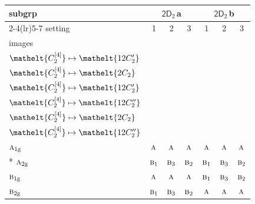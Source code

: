\documentclass[10pt,a4paper]{article}
\numberwithin{equation}{section}
\newcommand{\eltfont}[1]{{\let\sigma\eltsigma\mathelt{#1}}}
\newcommand{\grp}[1]{\mathsf{#1}}
\newcommand{\irr}[1]{\text{\normalfont\scshape #1}}
\newcommand{\cls}[1]{\eltfont{#1}}
\newcommand{\ptag}[1]{\mathrm{#1}}
\newcommand{\clsletter}[1]{\,{\scriptsize\color{black!55}#1}}
\newcommand{\genidx}[2]{#1^{[\mathrm{#2}]}}
\begin{document}
{\small\begin{longtable}{@{}lcccccc@{}}\toprule
subgrp & \multicolumn{3}{c}{\href{2D2.pdf}{$\grp{2D_{2}}$}\clsletter{a}} & \multicolumn{3}{c}{\href{2D2.pdf}{$\grp{2D_{2}}$}\clsletter{b}}\\\cmidrule(lr){2-4}\cmidrule(lr){5-7}
setting & 1 & 2 & 3 & 1 & 2 & 3\\
images & {\scriptsize\begin{tabular}[t]{@{}c@{}}$\cls{\genidx{C_{2}}{2}} \mapsto \cls{2C_{2}}$\\$\cls{\genidx{C_{2}}{4}} \mapsto \cls{12C_{2}'}$\end{tabular}} & {\scriptsize\begin{tabular}[t]{@{}c@{}}$\cls{\genidx{C_{2}}{2}} \mapsto \cls{12C_{2}'}$\\$\cls{\genidx{C_{2}}{4}} \mapsto \cls{2C_{2}}$\end{tabular}} & {\scriptsize\begin{tabular}[t]{@{}c@{}}$\cls{\genidx{C_{2}}{2}} \mapsto \cls{12C_{2}'}$\\$\cls{\genidx{C_{2}}{4}} \mapsto \cls{12C_{2}'}$\end{tabular}} & {\scriptsize\begin{tabular}[t]{@{}c@{}}$\cls{\genidx{C_{2}}{2}} \mapsto \cls{2C_{2}}$\\$\cls{\genidx{C_{2}}{4}} \mapsto \cls{12C_{2}''}$\end{tabular}} & {\scriptsize\begin{tabular}[t]{@{}c@{}}$\cls{\genidx{C_{2}}{2}} \mapsto \cls{12C_{2}''}$\\$\cls{\genidx{C_{2}}{4}} \mapsto \cls{2C_{2}}$\end{tabular}} & {\scriptsize\begin{tabular}[t]{@{}c@{}}$\cls{\genidx{C_{2}}{2}} \mapsto \cls{12C_{2}''}$\\$\cls{\genidx{C_{2}}{4}} \mapsto \cls{12C_{2}''}$\end{tabular}}\\\midrule\endhead
\bottomrule\endfoot\endlastfoot
$\irr{a}_{1\ptag{g}}$ & $\irr{a}$ & $\irr{a}$ & $\irr{a}$ & $\irr{a}$ & $\irr{a}$ & $\irr{a}$\\*
$\irr{a}_{2\ptag{g}}$ & $\irr{b}_{1}$ & $\irr{b}_{3}$ & $\irr{b}_{2}$ & $\irr{b}_{1}$ & $\irr{b}_{3}$ & $\irr{b}_{2}$\\
$\irr{b}_{1\ptag{g}}$ & $\irr{a}$ & $\irr{a}$ & $\irr{a}$ & $\irr{b}_{1}$ & $\irr{b}_{3}$ & $\irr{b}_{2}$\\
$\irr{b}_{2\ptag{g}}$ & $\irr{b}_{1}$ & $\irr{b}_{3}$ & $\irr{b}_{2}$ & $\irr{a}$ & $\irr{a}$ & $\irr{a}$\\

\end{longtable}}
\end{document}
